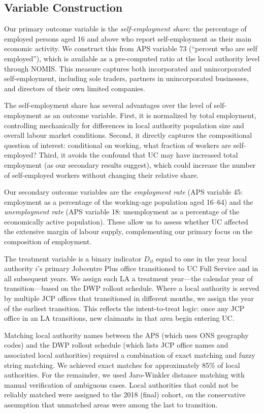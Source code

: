 \documentclass[12pt]{article}
\begin{document}
\subsection{Variable Construction}

Our primary outcome variable is the \textit{self-employment share}: the percentage of employed persons aged 16 and above who report self-employment as their main economic activity. We construct this from APS variable 73 (``percent who are self employed''), which is available as a pre-computed ratio at the local authority level through NOMIS. This measure captures both incorporated and unincorporated self-employment, including sole traders, partners in unincorporated businesses, and directors of their own limited companies.

The self-employment share has several advantages over the level of self-employment as an outcome variable. First, it is normalized by total employment, controlling mechanically for differences in local authority population size and overall labour market conditions. Second, it directly captures the compositional question of interest: conditional on working, what fraction of workers are self-employed? Third, it avoids the confound that UC may have increased total employment (as our secondary results suggest), which could increase the number of self-employed workers without changing their relative share.

Our secondary outcome variables are the \textit{employment rate} (APS variable 45: employment as a percentage of the working-age population aged 16--64) and the \textit{unemployment rate} (APS variable 18: unemployment as a percentage of the economically active population). These allow us to assess whether UC affected the extensive margin of labour supply, complementing our primary focus on the composition of employment.

The treatment variable is a binary indicator $D_{it}$ equal to one in the year local authority $i$'s primary Jobcentre Plus office transitioned to UC Full Service and in all subsequent years. We assign each LA a treatment year---the calendar year of transition---based on the DWP rollout schedule. Where a local authority is served by multiple JCP offices that transitioned in different months, we assign the year of the earliest transition. This reflects the intent-to-treat logic: once any JCP office in an LA transitions, new claimants in that area begin entering UC.

Matching local authority names between the APS (which uses ONS geography codes) and the DWP rollout schedule (which lists JCP office names and associated local authorities) required a combination of exact matching and fuzzy string matching. We achieved exact matches for approximately 85\% of local authorities. For the remainder, we used Jaro-Winkler distance matching with manual verification of ambiguous cases. Local authorities that could not be reliably matched were assigned to the 2018 (final) cohort, on the conservative assumption that unmatched areas were among the last to transition.
\end{document}
